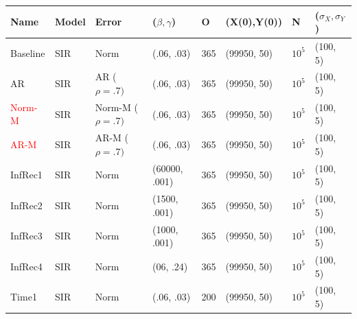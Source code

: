 \documentclass[12pt]{article}
\begin{document}
\begin{table}[]
\centering
\begin{tabular}{@{}llllllll@{}}
\toprule
\textbf{Name} & \textbf{Model} & \textbf{Error} & \textbf{($\beta, \gamma$)} & \textbf{O} & \textbf{(X(0),Y(0))} & \textbf{N} & \textbf{($\sigma_X, \sigma_Y$)} \\ \midrule
  Baseline        & SIR      &   Norm             & (.06, .03)                          &     365       &  (99950, 50)                    &  $10^5$          &(100, 5)                                \\ \midrule
  AR       & SIR      &   AR ($\rho=.7)$             & (.06, .03)                          &     365       &  (99950, 50)                    &  $10^5$          &(100, 5)                            \\ \midrule
  \textcolor{red}{Norm-M}      & SIR      &   Norm-M ($\rho=.7)$             & (.06, .03)                          &     365       &  (99950, 50)                    &  $10^5$          &(100, 5)                            \\ \midrule
   \textcolor{red}{AR-M}       & SIR      &   AR-M ($\rho=.7)$             & (.06, .03)                          &     365       &  (99950, 50)                    &  $10^5$          &(100, 5)                            \\ \midrule
  InfRec1       & SIR      &   Norm             & (60000, .001)                          &     365       &  (99950, 50)                    &  $10^5$          &(100, 5)\\
  InfRec2      & SIR      &   Norm             & (1500, .001)                          &     365       &  (99950, 50)                    &  $10^5$          &(100, 5)                                \\
  InfRec3      & SIR      &   Norm             & (1000, .001)                          &     365       &  (99950, 50)                    &  $10^5$          &(100, 5)                                \\
InfRec4      & SIR      &   Norm             & (06, .24)                          &     365       &  (99950, 50)                    &  $10^5$          &(100, 5)                                \\ \midrule
  Time1 & SIR &  Norm   & (.06, .03)                          &     200       &  (99950, 50)                    &  $10^5$          &(100, 5)                                \\

\end{tabular}
\end{table}
\end{document}
